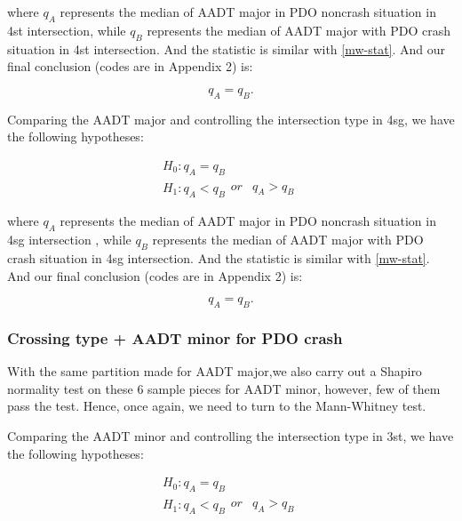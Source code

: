 \documentclass[11pt]{scrartcl} %
\begin{document}
where $q_A$ represents the median of AADT major in PDO noncrash situation in 4st intersection, while $q_B$ represents the median of AADT major with PDO crash situation in 4st intersection. And the statistic is similar with \eqref{mw-stat}. And our final conclusion (codes are in Appendix 2) is:

\begin{equation*}
{q_A} = {q_B}.
\end{equation*}

\par

Comparing the AADT major and controlling the intersection type in 4sg, we have the following hypotheses:

\begin{equation*}
\begin{array}{l}
{H_0}:{q_A} = {q_B}\\
{H_1}:{q_A} < {q_B}\begin{array}{*{20}{c}}
{or}&{{q_A} > {q_B}}
\end{array}
\end{array}
\end{equation*}

where $q_A$ represents the median of AADT major in PDO noncrash situation in 4sg intersection , while $q_B$ represents the median of AADT major with PDO crash situation in 4sg intersection. And the statistic is similar with \eqref{mw-stat}. And our final conclusion (codes are in Appendix 2) is:

\begin{equation*}
{q_A} = {q_B}.
\end{equation*}

\subsubsection{Crossing type + AADT minor for PDO crash}

With the same partition made for AADT major,we also carry out a Shapiro normality test on these 6 sample pieces for AADT minor, however, few of them pass the test. Hence, once again, we need to turn to the Mann-Whitney test.

\par

Comparing the AADT minor and controlling the intersection type in 3st, we have the following hypotheses:

\begin{equation*}
\begin{array}{l}
{H_0}:{q_A} = {q_B}\\
{H_1}:{q_A} < {q_B}\begin{array}{*{20}{c}}
{or}&{{q_A} > {q_B}}
\end{array}
\end{array}
\end{equation*}
\end{document}
